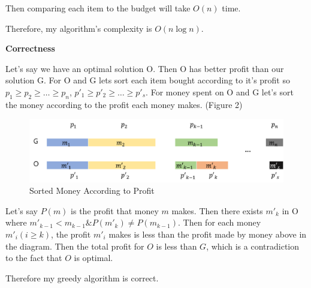 \documentclass[a4paper,11pt]{article}
\begin{document}
\begin{enumerate}
Then comparing each item to the budget will take $O(n)$ time.

Therefore, my algorithm's complexity is $O(n\log{}n)$.

{\bf Correctness}


Let's say we have an optimal solution O. 
Then O has better profit than our solution G.
For O and G lets sort each item bought according to it's profit so $p_1\geq p_2\geq \dots \geq p_n $, $p'_1\geq p'_2\geq \dots \geq p'_s $.
For money spent on O and G let's sort the money according to the profit each money makes. (Figure 2)

\begin{figure}[hbt]
	\centering
	\includegraphics[scale=0.4]{figure2.png}
	\caption{Sorted Money According to Profit}
\end{figure}
Let's say $P(m)$ is the profit that money $m$ makes.
Then there exists $m'_k$ in O where $m'_{k-1} < m_{k-1} \& P(m'_k) \neq P(m_{k-1})$. Then for each money $m'_i (i\geq k)$, the profit $m'_i$ makes is less than the profit made by money above in the diagram. Then the total profit for $O$ is less than $G$, which is a contradiction to the fact that $O$ is optimal. 

Therefore my greedy algorithm is correct.

\end{enumerate}
\end{document}
